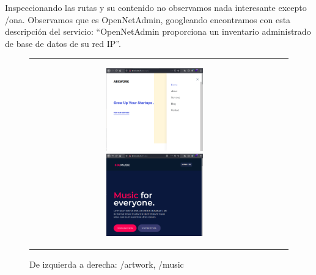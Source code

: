 \documentclass{article}
\begin{document}
Inspeccionando las rutas y su contenido no observamos nada interesante excepto /ona. Observamos que es OpenNetAdmin, googleando encontramos con esta descripción del servicio: “OpenNetAdmin proporciona un inventario administrado de base de datos de su red IP”.
\begin{figure}[H]
	\center
	\begin{tabular}[c]{cc}
		\begin{subfigure}[c]{\linewidth}
		\includegraphics[width=0.5\textwidth]{images/openadmin/3-artwork.png}
		\hfill
		\includegraphics[width=0.5\textwidth]{images/openadmin/4-music.png}
		\end{subfigure}\par\medskip
	\end{tabular}
	\caption{De izquierda a derecha: /artwork, /music}
\end{figure}
\end{document}
